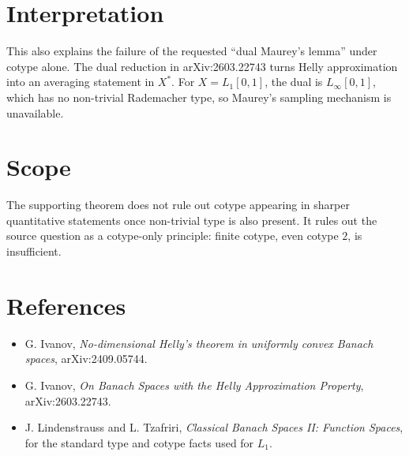 \documentclass[11pt]{article}
\begin{document}
\section{Interpretation}

This also explains the failure of the requested ``dual Maurey's lemma'' under
cotype alone.  The dual reduction in arXiv:2603.22743 turns Helly approximation
into an averaging statement in \(X^*\).  For \(X=L_1[0,1]\), the dual is
\(L_\infty[0,1]\), which has no non-trivial Rademacher type, so Maurey's
sampling mechanism is unavailable.

\section{Scope}

The supporting theorem does not rule out cotype appearing in sharper
quantitative statements once non-trivial type is also present.  It rules out
the source question as a cotype-only principle: finite cotype, even cotype
\(2\), is insufficient.

\section{References}

\begin{itemize}[leftmargin=*]
\item G. Ivanov, \emph{No-dimensional Helly's theorem in uniformly convex
Banach spaces}, arXiv:2409.05744.
\item G. Ivanov, \emph{On Banach Spaces with the Helly Approximation Property},
arXiv:2603.22743.
\item J. Lindenstrauss and L. Tzafriri, \emph{Classical Banach Spaces II:
Function Spaces}, for the standard type and cotype facts used for \(L_1\).
\end{itemize}
\end{document}
